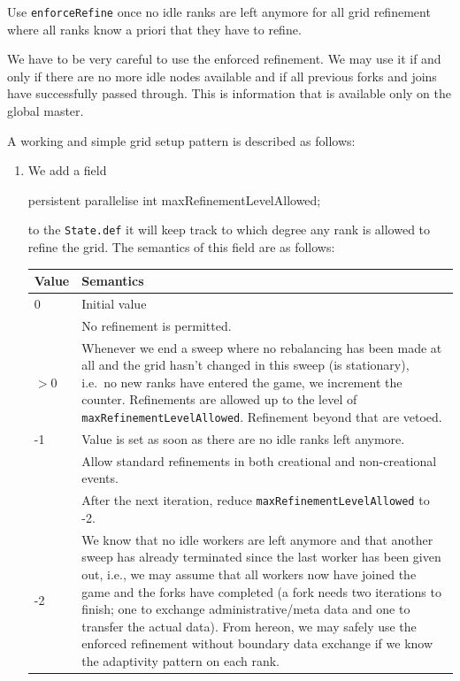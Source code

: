 \begin{solution}
Use \texttt{enforceRefine} once no idle ranks are left anymore for all grid
refinement where all ranks know a priori that they have to refine.
\end{solution}


We have to be very careful to use the enforced refinement.
We may use it if and only if there are no more idle nodes available and if all
previous forks and joins have successfully passed through. 
This is information that is available only on the global master. 

A working and simple grid setup pattern is described as follows:
\begin{enumerate}
  \item We add a field
    \begin{code}
      persistent parallelise int maxRefinementLevelAllowed;
    \end{code}
    to the \texttt{State.def} it will keep track to which degree any rank is
    allowed to refine the grid. 
    The semantics of this field are as follows:
    \begin{center}
     \begin{tabular}{lp{12cm}}
       Value & Semantics \\
       \hline
       0 & Initial value \\
         & No refinement is permitted. 
       \\
       \hline
       $>0$ & Whenever we end a sweep where no rebalancing has been made at all
       and the grid hasn't changed in this sweep (is stationary), i.e.~no new
       ranks have entered the game, we increment the counter.
       Refinements are allowed up to the level of
       \texttt{maxRefinementLevelAllowed}. Refinement beyond that are vetoed. 
       \\
       \hline
       -1 & Value is set as soon as there are no idle ranks left anymore. \\
          & Allow standard refinements in both creational and non-creational
          events. \\
          & After the next iteration, reduce \texttt{maxRefinementLevelAllowed}
          to -2.
       \\
       \hline
       -2 & We know that no idle workers are left anymore and that another sweep
       has already terminated since the last worker has been given out, i.e.,
       we may assume that all workers now have joined the game and the forks
       have completed (a fork needs two iterations to finish; one to exchange
       administrative/meta data and one to transfer the actual data). From
       hereon, we may safely use the enforced refinement without boundary data
       exchange if we know the adaptivity pattern on each rank.
     \end{tabular}
    \end{center}


\end{enumerate}
